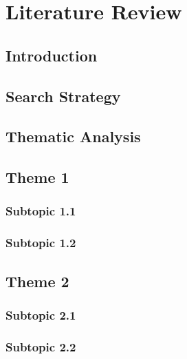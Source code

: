 \chapter{Literature Review}
\label{chapter:literature-review}


\section{Introduction}

\section{Search Strategy}

\section{Thematic Analysis}

\section{Theme 1}

\subsection{Subtopic 1.1}

\subsection{Subtopic 1.2}

\section{Theme 2}

\subsection{Subtopic 2.1}

\subsection{Subtopic 2.2}


